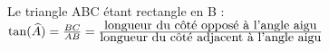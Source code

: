 
Le triangle ABC étant rectangle en B :
$\tan(\widehat{A})={BC\over AB} ={\hbox{longueur du côté opposé à l'angle aigu}\over\hbox{longueur du côté adjacent à l'angle aigu}}$

